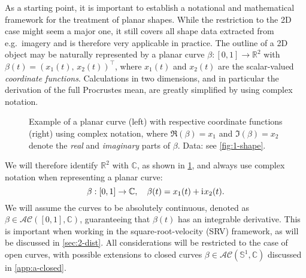\label{sec:2}
As a starting point, it is important to establish a notational and mathematical framework for the treatment of planar shapes.
While the restriction to the 2D case might seem a major one, it still covers all shape data extracted from e.g.\ imagery and is therefore very applicable in practice.
The outline of a 2D object may be naturally represented by a planar curve $\beta : [0,1] \rightarrow \mathbb{R}^2$ with $\beta(t) = (x_1(t),\, x_2(t))^\top$, where $x_1(t)$ and $x_2(t)$ are the scalar-valued \textit{coordinate functions}.
Calculations in two dimensions, and in particular the derivation of the full Procrustes mean, are greatly simplified by using complex notation.
\begin{figure}
  \centering
  \begin{subfigure}{.48\textwidth}
    \centering
  \end{subfigure}\hfill%
  \begin{subfigure}{.48\textwidth}
    \centering
    \begin{subfigure}{\textwidth}
      \centering
    \end{subfigure}
    \begin{subfigure}{\textwidth}
      \centering
    \end{subfigure}
  \end{subfigure}
  \caption{Example of a planar curve (left) with respective coordinate functions (right) using complex notation, where $\Re(\beta) = x_1$ and $\Im(\beta) = x_2$ denote the \emph{real} and \emph{imaginary} parts of $\beta$. Data: see \cref{fig:1-shape}.}
  \label{fig:2-curve}
\end{figure}
We will therefore identify $\mathbb{R}^2$ with $\mathbb{C}$, as shown in \cref{fig:2-curve}, and always use complex notation when representing a planar curve:
$$\beta : [0,1] \rightarrow \mathbb{C}, \quad \beta(t) = x_1(t) + \mathrm{i}\mkern1mu x_2(t).$$
We will assume the curves to be absolutely continuous, denoted as $\beta \in \mathcal{AC}([0,1], \mathbb{C})$, guaranteeing that $\beta(t)$ has an integrable derivative.
This is important when working in the square-root-velocity (SRV) framework, as will be discussed in \cref{sec:2-dist}.
All considerations will be restricted to the case of open curves, with possible extensions to closed curves $\beta \in \mathcal{AC}(\mathbb{S}^1, \mathbb{C})$ discussed in \cref{app:a-closed}.


